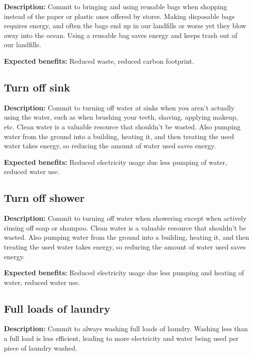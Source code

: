 \textbf{Description:} Commit to bringing and using reusable bags when shopping instead of the paper or plastic ones offered by stores. Making disposable bags requires energy, and often the bags end up in our landfills or worse yet they blow away into the ocean. Using a reusable bag saves energy and keeps trash out of our landfills.

\vspace{2ex}
\textbf{Expected benefits:} Reduced waste, reduced carbon footprint.


\subsection{Turn off sink}

\textbf{Description:} Commit to turning off water at sinks when you aren't actually using the water, such as when brushing your teeth, shaving, applying makeup, etc. Clean water is a valuable resource that shouldn't be wasted. Also pumping water from the ground into a building, heating it, and then treating the used water takes energy, so reducing the amount of water used saves energy.

\vspace{2ex}
\textbf{Expected benefits:} Reduced electricity usage due less pumping of water, reduced water use.


\subsection{Turn off shower}

\textbf{Description:} Commit to turning off water when showering except when actively rinsing off soap or shampoo. Clean water is a valuable resource that shouldn't be wasted. Also pumping water from the ground into a building, heating it, and then treating the used water takes energy, so reducing the amount of water used saves energy.

\vspace{2ex}
\textbf{Expected benefits:} Reduced electricity usage due less pumping and heating of water, reduced water use.


\subsection{Full loads of laundry}

\textbf{Description:} Commit to always washing full loads of laundry. Washing less than a full load is less efficient, leading to more electricity and water being used per piece of laundry washed.

